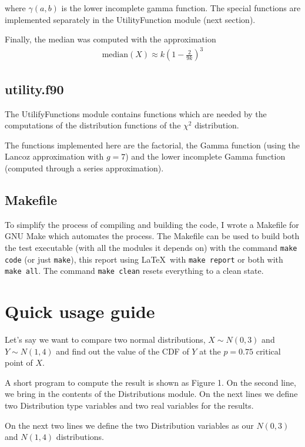 \documentclass[a4paper]{article}
\begin{document}
where $\gamma(a,b)$ is the lower incomplete gamma function. The special functions are implemented separately in the UtilityFunction module (next section).

Finally, the median was computed with the approximation
\begin{align}
 \text{median}(X) \approx k(1 - \frac{2}{9k})^3
\end{align}

\subsection{utility.f90}

The UtilifyFunctions module contains functions which are needed by the computations of the distribution functions of the $\chi^2$ distribution.

The functions implemented here are the factorial, the Gamma function (using the Lancoz approximation with $g=7$) and the lower incomplete Gamma function (computed through a series approximation).

\subsection{Makefile}

To simplify the process of compiling and building the code, I wrote a Makefile for GNU Make which automates the process. The Makefile can be used to build both the test executable (with all the modules it depends on) with the command \verb+make code+ (or just \verb+make+), this report using \LaTeX~with \verb+make report+ or both with \verb+make all+. The command \verb+make clean+ resets everything to a clean state.

\section{Quick usage guide}

Let's say we want to compare two normal distributions, $X \sim N(0, 3)$ and $Y \sim N(1, 4)$ and find out the value of the CDF of $Y$ at the $p=0.75$ critical point of $X$.

A short program to compute the result is shown as Figure 1. On the second line, we bring in the contents of the Distributions module. On the next lines we define two Distribution type variables and two real variables for the results.

On the next two lines we define the two Distribution variables as our $N(0,3)$ and $N(1,4)$ distributions.
\end{document}
